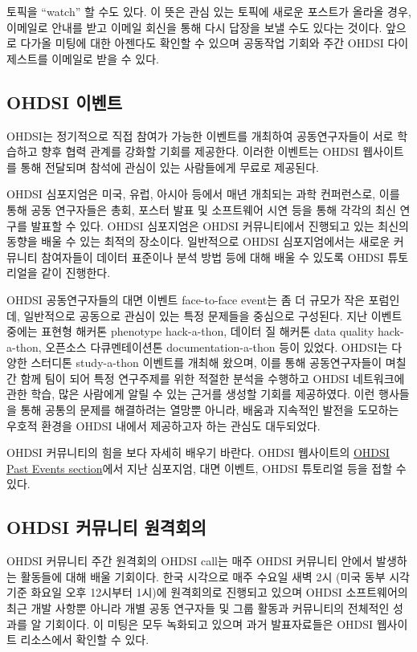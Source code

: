 \documentclass[10.5pt]{book}
\theoremstyle{definition}
\theoremstyle{definition}
\theoremstyle{definition}
\theoremstyle{remark}
\let\BeginKnitrBlock\begin \let\EndKnitrBlock\end
\begin{document}
\BeginKnitrBlock{rmdimportant}
토픽을 ``watch'' 할 수도 있다. 이 뜻은 관심 있는 토픽에 새로운 포스트가
올라올 경우, 이메일로 안내를 받고 이메일 회신을 통해 다시 답장을 보낼
수도 있다는 것이다. 앞으로 다가올 미팅에 대한 아젠다도 확인할 수 있으며
공동작업 기회와 주간 OHDSI 다이제스트를 이메일로 받을 수 있다.
\EndKnitrBlock{rmdimportant}

\hypertarget{ohdsi-}{\subsection{OHDSI 이벤트}\label{ohdsi-}}

OHDSI는 정기적으로 직접 참여가 가능한 이벤트를 개최하여 공동연구자들이
서로 학습하고 향후 협력 관계를 강화할 기회를 제공한다. 이러한 이벤트는
OHDSI 웹사이트를 통해 전달되며 참석에 관심이 있는 사람들에게 무료로
제공된다.

OHDSI 심포지엄은 미국, 유럽, 아시아 등에서 매년 개최되는 과학
컨퍼런스로, 이를 통해 공동 연구자들은 총회, 포스터 발표 및 소프트웨어
시연 등을 통해 각각의 최신 연구를 발표할 수 있다. OHDSI 심포지엄은 OHDSI
커뮤니티에서 진행되고 있는 최신의 동향을 배울 수 있는 최적의 장소이다.
일반적으로 OHDSI 심포지엄에서는 새로운 커뮤니티 참여자들이 데이터
표준이나 분석 방법 등에 대해 배울 수 있도록 OHDSI 튜토리얼을 같이
진행한다.

OHDSI 공동연구자들의 대면 이벤트 face-to-face event는 좀 더 규모가 작은
포럼인데, 일반적으로 공동으로 관심이 있는 특정 문제들을 중심으로
구성된다. 지난 이벤트 중에는 표현형 해커톤 phenotype hack-a-thon, 데이터
질 해커톤 data quality hack-a-thon, 오픈소스 다큐멘테이션톤
documentation-a-thon 등이 있었다. OHDSI는 다양한 스터디톤 study-a-thon
이벤트를 개최해 왔으며, 이를 통해 공동연구자들이 며칠간 함께 팀이 되어
특정 연구주제를 위한 적절한 분석을 수행하고 OHDSI 네트워크에 관한 학습,
많은 사람에게 알릴 수 있는 근거를 생성할 기회를 제공하였다. 이런
행사들을 통해 공통의 문제를 해결하려는 열망뿐 아니라, 배움과 지속적인
발전을 도모하는 우호적 환경을 OHDSI 내에서 제공하고자 하는 관심도
대두되었다.

OHDSI 커뮤니티의 힘을 보다 자세히 배우기 바란다. OHDSI 웹사이트의
\href{https://www.ohdsi.org/past-events/}{OHDSI Past Events section}에서
지난 심포지엄, 대면 이벤트, OHDSI 튜토리얼 등을 접할 수 있다.

\subsection{OHDSI 커뮤니티 원격회의}\label{ohdsi--}

OHDSI 커뮤니티 주간 원격회의 OHDSI call는 매주 OHDSI 커뮤니티 안에서
발생하는 활동들에 대해 배울 기회이다. 한국 시각으로 매주 수요일 새벽 2시
(미국 동부 시각 기준 화요일 오후 12시부터 1시)에 원격회의로 진행되고
있으며 OHDSI 소프트웨어의 최근 개발 사항뿐 아니라 개별 공동 연구자들 및
그룹 활동과 커뮤니티의 전체적인 성과를 알 기회이다. 이 미팅은 모두
녹화되고 있으며 과거 발표자료들은 OHDSI 웹사이트 리소스에서 확인할 수
있다.
\end{document}
